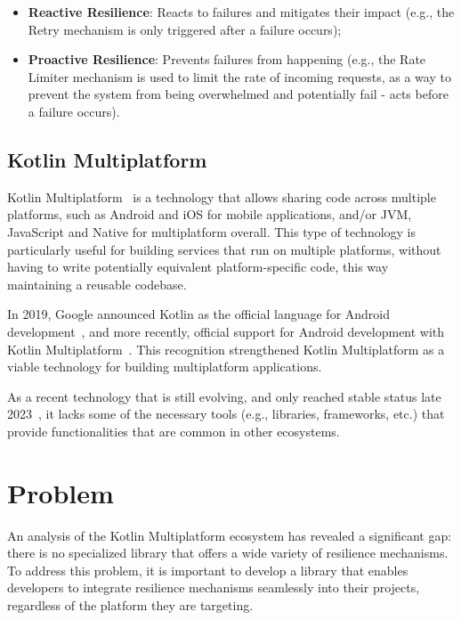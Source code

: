 \begin{itemize}
    \item \textbf{Reactive Resilience}: Reacts to failures and mitigates their impact (e.g., the Retry mechanism is only triggered after a failure occurs);
    \item \textbf{Proactive Resilience}: Prevents failures from happening (e.g., the Rate Limiter mechanism is used to limit the rate of incoming requests, as a way to prevent the system from being overwhelmed and potentially fail - acts before a failure occurs).
\end{itemize}

\subsection{Kotlin Multiplatform}\label{subsec:kotlin-multiplatform}

Kotlin Multiplatform~\cite{kotlin-multiplatform} is a technology that allows sharing code across multiple platforms,
such as Android and iOS for mobile applications, and/or JVM, JavaScript and Native for multiplatform overall.
This type of technology is particularly useful for building services that run on multiple platforms,
without having to write potentially equivalent platform-specific code, this way maintaining a reusable codebase.

In 2019, Google announced Kotlin as the official language for Android development~\cite{google-android-kotlin},
and more recently,
official support for Android development with Kotlin Multiplatform~\cite{android-kotlin-multiplatform, google-kotlin-multiplatform}.
This recognition strengthened Kotlin Multiplatform as a viable technology for building multiplatform applications.

As a recent technology that is still evolving,
and only reached stable status late 2023~\cite{kotlin-multiplatform-stable},
it lacks some of the necessary tools (e.g., libraries, frameworks, etc.)
that provide functionalities that are common in other ecosystems.


\section{Problem}\label{sec:problem}

An analysis of the Kotlin Multiplatform ecosystem has revealed a significant gap:
there is no specialized library that offers a wide variety of resilience mechanisms.
To address this problem, it is important to develop a library that enables developers to integrate resilience mechanisms seamlessly into their projects, regardless of the platform they are targeting.


